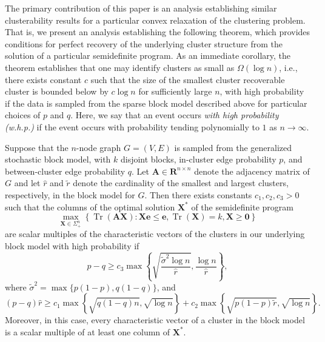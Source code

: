 \documentclass[twoside,11pt]{article}
\newcommand{\R}{\mathbf{R}}
\DeclareMathOperator{\tr}{{Tr}}
\newcommand{\e}{\bs {e}}
\newcommand{\bs}{\boldsymbol}
\newcommand{\X}{\bs {X}}
\newcommand{\0}{\bs{0}}
\newcommand{\bra}[1]{\ensuremath{\left\{ #1 \right\}}} %
\newcommand{\ra}{\rightarrow}
\begin{document}
The primary contribution of this paper is an analysis establishing similar clusterability results for a particular
convex relaxation of the clustering problem.
That is, we present an analysis establishing the following theorem, which provides conditions for perfect recovery of the underlying cluster structure from
the solution of a particular semidefinite program.
As an immediate corollary, the theorem establishes that
one may identify clusters
as small as \( \Omega(\log n)\),
i.e.,  there exists constant $c$ such that the size of the smallest cluster recoverable cluster is bounded below by \(c \log n \) for sufficiently large \(n\),
with high probability
if the data is sampled from the sparse block model described above
for particular choices of $p$ and $q$.
Here, we say that an event occurs \emph{with high probability (w.h.p.)} if the event occurs with probability
tending polynomially to $1$ as $n \ra \infty$.

\begin{theorem} \label{thm: simple}
	Suppose that the \(n\)-node graph \(G = (V,E)\) is sampled from the generalized stochastic block model,
	with \(k\) disjoint blocks, in-cluster edge probability \(p\), and between-cluster edge probability \(q\).
	Let \(\bs A \in \R^{n\times n}\) denote the adjacency matrix of \(G\)
	and let \(\hat r\) and \(\tilde r\) denote the cardinality of the smallest and largest clusters, respectively,
	in the block model for \(G\).
	Then there exists constants $c_1, c_2, c_3 > 0$ such that the columns of the optimal solution \(\X^*\) of
	the semidefinite program
	\begin{equation*} \label{eq: SDP}
	\max_{\X \in \Sigma_+^n} \bra{ \tr(\bs A \X) : \X \e \le \e, \tr(\X) = k, \X \ge \0 }
	\end{equation*}
	are scalar multiples of the characteristic vectors of the clusters in our underlying block model
	with high probability
	if
	\[
		p - q \ge c_3 \max \bra{ \sqrt{\frac{\tilde \sigma^2 \log n}{\hat r}}, \frac{\log n}{\hat r} },
	\]
	where $\tilde \sigma^2 = \max\{{p(1-p)}, q(1-q) \}$, and
	\begin{equation*}
		(p-q) \hat r \ge c_1 \max \bra{ \sqrt{ q(1-q) n },\sqrt{ \log n}  }
		+ c_2 \max \bra{ \sqrt{p(1-p) \tilde r }, \sqrt{\log n} }.
	\end{equation*}
	Moreover, in this case, every characteristic vector of a cluster in the block model is a
	scalar multiple of at least one column of \(\X^*\).
\end{theorem}
\end{document}
